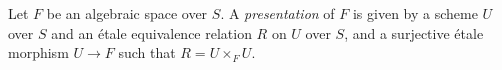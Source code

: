 \begin{definition}
\label{definition-presentation}
Let $F$ be an algebraic space over $S$.
A {\it presentation} of $F$ is given by a scheme
$U$ over $S$ and an \'etale equivalence relation $R$ on $U$ over $S$, and
a surjective \'etale morphism $U \to F$ such that $R = U \times_F U$.
\end{definition}